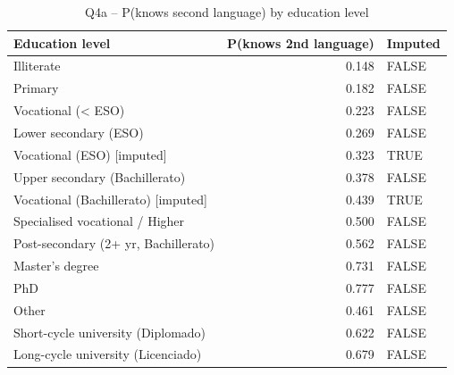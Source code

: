 \begin{table}

\caption{Q4a – P(knows second language) by education level}
\centering
\begin{tabular}[t]{lrl}
\toprule
Education level & P(knows 2nd language) & Imputed\\
\midrule
Illiterate & 0.148 & FALSE\\
Primary & 0.182 & FALSE\\
Vocational (< ESO) & 0.223 & FALSE\\
Lower secondary (ESO) & 0.269 & FALSE\\
Vocational (ESO) [imputed] & 0.323 & TRUE\\
\addlinespace
Upper secondary (Bachillerato) & 0.378 & FALSE\\
Vocational (Bachillerato) [imputed] & 0.439 & TRUE\\
Specialised vocational / Higher & 0.500 & FALSE\\
Post-secondary (2+ yr, Bachillerato) & 0.562 & FALSE\\
Master's degree & 0.731 & FALSE\\
\addlinespace
PhD & 0.777 & FALSE\\
Other & 0.461 & FALSE\\
Short-cycle university (Diplomado) & 0.622 & FALSE\\
Long-cycle university (Licenciado) & 0.679 & FALSE\\
\bottomrule
\end{tabular}
\end{table}
